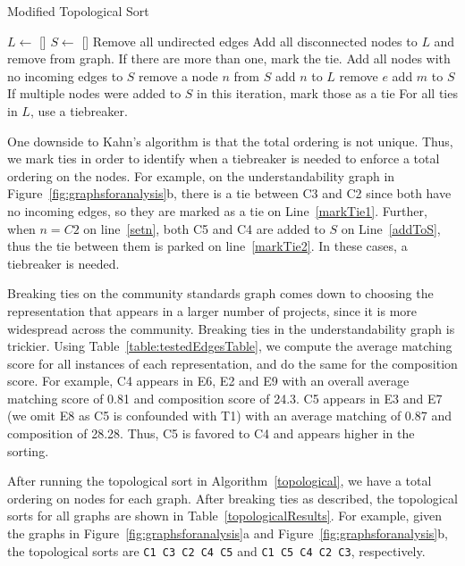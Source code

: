 \begin{algorithm}
  \caption{Modified Topological Sort}\label{topological}
  \begin{algorithmic}[1]
\State  $L \gets$ []
\State $S \gets$ []
\State Remove all undirected edges
\State Add all disconnected nodes to $L$ and remove from graph. If there are more than one, mark the tie. \label{markTie1}
\State Add all nodes with no incoming edges to $S$ \label{addnoincomingtos}
 \label{beginwhile}
	\State remove a node $n$ from $S$ \label{setn}
	\State add $n$ to $L$  \label{addntoL}
		\State remove $e$
			\State add $m$ to $S$ \label{addToS}
		\EndIf
	\EndFor
	\State If multiple nodes were added to $S$ in this iteration, mark those as a tie \label{markTie2}
\EndWhile
\State For all ties in $L$, use a tiebreaker. 
  \end{algorithmic}
\end{algorithm}

One downside to Kahn's algorithm is that the total ordering is not unique. Thus, we mark ties in order to identify when a tiebreaker is needed to enforce a total ordering on the nodes. For example, on the understandability graph in Figure~\ref{fig:graphsforanalysis}b, there is a tie between C3 and C2 since both have no incoming edges, so they are marked as a tie on Line~\ref{markTie1}. Further, when $n=C2$ on line~\ref{setn}, both C5 and C4 are added to $S$ on Line~\ref{addToS}, thus the tie between them is parked on line~\ref{markTie2}. In these cases, a tiebreaker is needed. 

Breaking ties on the community standards graph comes down to choosing the representation that appears in a larger number of projects, since it is more widespread across the community. Breaking ties in the understandability graph is trickier. Using Table~\ref{table:testedEdgesTable}, we compute the average matching score for all instances of each representation, and do the same for the composition score. For example, C4 appears in E6, E2 and E9 with an overall average matching score of 0.81 and composition score of 24.3. C5 appears in E3 and E7 (we omit E8 as C5 is confounded with T1) with an average matching of 0.87 and composition of 28.28. Thus, C5 is favored to C4 and appears higher in the sorting. 

After running the topological sort in Algorithm~\ref{topological}, we have a total ordering on nodes for each graph. After breaking ties as described, the topological sorts for all graphs are shown in Table~\ref{topologicalResults}.  For example, given the graphs in Figure~\ref{fig:graphsforanalysis}a and Figure~\ref{fig:graphsforanalysis}b, the topological sorts are {\tt C1 C3 C2 C4 C5} and {\tt C1 C5 C4 C2 C3}, respectively. 

